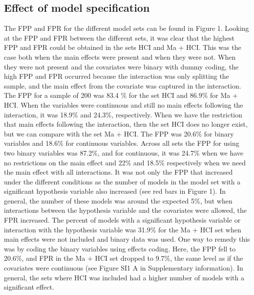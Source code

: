 \subsection{Effect of model specification}
The FPP and FPR for the different model sets can be found in Figure 1. Looking at the FPP and FPR between the different sets, it was clear that the highest FPP and FPR could be obtained in the sets HCI and Ma + HCI. This was the case both when the main effects were present and when they were not. When they were not present and the covariates were binary with dummy coding, the high FPP and FPR occurred because the interaction was only splitting the sample, and the main effect from the covariate was captured in the interaction. The FPP for a sample of 200 was 83.4 \% for the set HCI and 86.9\% for Ma + HCI. When the variables were continuous and still no main effects following the interaction, it was 18.9\% and 24.3\%, respectively. When we have the restriction that main effects following the interaction, then the set HCI does no longer exist, but we can compare with the set Ma + HCI. The FPP was 20.6\% for binary variables and 18.6\% for continuous variables. Across all sets the FPP for using two binary variables was 87.2\%, and for continuous, it was 24.7\% when we have no restrictions on the main effect and 22\% and 18.5\% respectively when we need the main effect with all interactions. 
It was not only the FPP that increased under the different conditions as the number of models in the model set with a significant hypothesis variable also increased (see red bars in Figure 1). In general, the number of these models was around the expected 5\%, but when interactions between the hypothesis variable and the covariates were allowed, the FPR increased. The percent of models with a significant hypothesis variable or interaction with the hypothesis variable was 31.9\% for the Ma + HCI set when main effects were not included and binary data was used. One way to remedy this was by coding the binary variables using effects coding. Here, the FPP fell to 20.6\%, and FPR in the Ma + HCI set dropped to 9.7\%, the same level as if the covariates were continuous (see Figure SI1 A in Supplementary information). In general, the sets where HCI was included had a higher number of models with a significant effect. 
